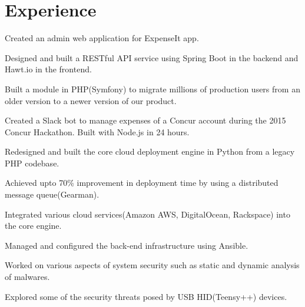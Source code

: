 \documentclass[]{deedy-resume-openfont}
\begin{document}
\begin{minipage}[t]{0.66\textwidth}


\section{Experience}

\vspace{\topsep} %
\begin{tightemize}
\item Created an admin web application for ExpenseIt app.
\item Designed and built a RESTful API service using Spring Boot in the backend and Hawt.io in the frontend.
\item Built a module in PHP(Symfony) to migrate millions of production users from an older version to a newer version of our product.
\item Created a Slack bot to manage expenses of a Concur account during the 2015 Concur Hackathon. Built with Node.js in 24 hours.
\end{tightemize}
\sectionsep

\begin{tightemize}
\item Redesigned and built the core cloud deployment engine in Python from a legacy PHP codebase.
\item Achieved upto 70\% improvement in deployment time by using a distributed message queue(Gearman).
\item Integrated various cloud services(Amazon AWS, DigitalOcean, Rackspace) into the core engine.
\item Managed and configured the back-end infrastructure using Ansible.
\end{tightemize}
\sectionsep

\begin{tightemize}
\item Worked on various aspects of system security such as static and dynamic analysis of malwares.
\item Explored some of the security threats posed by USB HID(Teensy++) devices.
\end{tightemize}
\sectionsep


\end{minipage}
\end{document}
